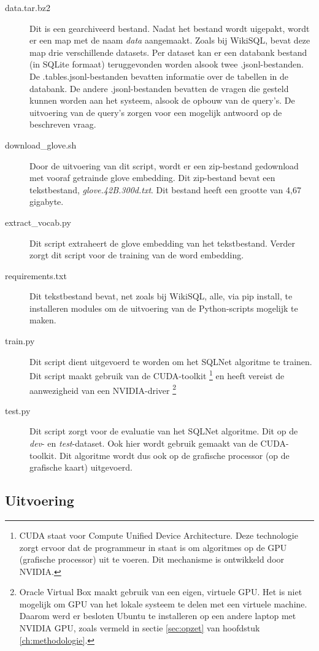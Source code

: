 \begin{description}
	\item[data.tar.bz2] Dit is een gearchiveerd bestand. Nadat het bestand wordt uigepakt, wordt er een map met de naam \textit{data} aangemaakt. Zoals bij WikiSQL, bevat deze map drie verschillende datasets. Per dataset kan er een databank bestand (in SQLite formaat) teruggevonden worden alsook twee .jsonl-bestanden. De .tables.jsonl-bestanden bevatten informatie over de tabellen in de databank. De andere .jsonl-bestanden bevatten de vragen die gesteld kunnen worden aan het systeem, alsook de opbouw van de query's. De uitvoering van de query's zorgen voor een mogelijk antwoord op de beschreven vraag.
	\item[download\_glove.sh] Door de uitvoering van dit script, wordt er een zip-bestand gedownload met vooraf getrainde glove embedding. Dit zip-bestand bevat een tekstbestand, \textit{glove.42B.300d.txt}. Dit bestand heeft een grootte van 4,67 gigabyte.
	\item[extract\_vocab.py] Dit script extraheert de glove embedding van het tekstbestand. Verder zorgt dit script voor de training van de word embedding. 
	\item[requirements.txt] Dit tekstbestand bevat, net zoals bij WikiSQL, alle, via pip install, te installeren modules om de uitvoering van de Python-scripts mogelijk te maken.
	\item[train.py] Dit script dient uitgevoerd te worden om het SQLNet algoritme te trainen. Dit script maakt gebruik van de CUDA-toolkit \footnote{CUDA staat voor Compute Unified Device Architecture. Deze technologie zorgt ervoor dat de programmeur in staat is om algoritmes op de GPU (grafische processor) uit te voeren. Dit mechanisme is ontwikkeld door NVIDIA.} en heeft vereist de aanwezigheid van een NVIDIA-driver \footnote{Oracle Virtual Box maakt gebruik van een eigen, virtuele GPU. Het is niet mogelijk om GPU van het lokale systeem te delen met een virtuele machine. Daarom werd er besloten Ubuntu te installeren op een andere laptop met NVIDIA GPU, zoals vermeld in sectie \ref{sec:opzet} van hoofdstuk \ref{ch:methodologie}.}
	\item[test.py] Dit script zorgt voor de evaluatie van het SQLNet algoritme. Dit op de \textit{dev}- en \textit{test}-dataset. Ook hier wordt gebruik gemaakt van de CUDA-toolkit. Dit algoritme wordt dus ook op de grafische processor (op de grafische kaart) uitgevoerd.
\end{description}

\subsection{Uitvoering}

